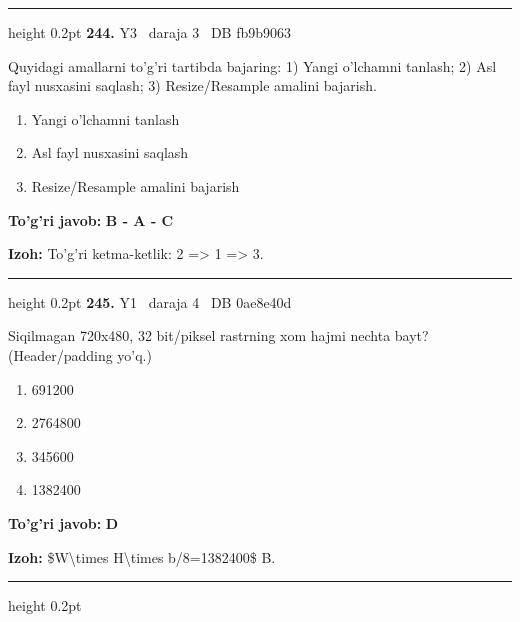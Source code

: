 \documentclass[10pt,a4paper,oneside]{article}
\begin{document}
\vspace{2mm}\hrule height 0.2pt \vspace{4mm}
\hypertarget{q244}{\textbf{\color{ink}244.}}  {\color{muted}\scriptsize Y3 \textbullet\ daraja 3 \textbullet\ DB fb9b9063}
\par
Quyidagi amallarni to'g'ri tartibda bajaring: 1) Yangi o'lchamni tanlash; 2) Asl fayl nusxasini saqlash; 3) Resize/Resample amalini bajarish.
\begin{enumerate}[label=\Alph*),leftmargin=9mm]
\item Yangi o'lchamni tanlash
\item Asl fayl nusxasini saqlash
\item Resize/Resample amalini bajarish
\end{enumerate}
\begin{tcolorbox}[enhanced,breakable,colback=teal!4,colframe=teal!45!black,boxrule=0.45pt,arc=1.2mm,left=2.8mm,right=2.8mm,top=2mm,bottom=2mm,before skip=2mm,after skip=2mm]
\textbf{\color{teal}To'g'ri javob:} \textbf{B - A - C}
\par\smallskip
\textbf{Izoh:} To'g'ri ketma-ketlik: 2 =\textgreater{} 1 =\textgreater{} 3.
\end{tcolorbox}
\vspace{2mm}\hrule height 0.2pt \vspace{4mm}
\hypertarget{q245}{\textbf{\color{ink}245.}}  {\color{muted}\scriptsize Y1 \textbullet\ daraja 4 \textbullet\ DB 0ae8e40d}
\par
Siqilmagan 720x480, 32 bit/piksel rastrning xom hajmi nechta bayt? (Header/padding yo'q.)
\begin{enumerate}[label=\Alph*),leftmargin=9mm]
\item 691200
\item 2764800
\item 345600
\item 1382400
\end{enumerate}
\begin{tcolorbox}[enhanced,breakable,colback=teal!4,colframe=teal!45!black,boxrule=0.45pt,arc=1.2mm,left=2.8mm,right=2.8mm,top=2mm,bottom=2mm,before skip=2mm,after skip=2mm]
\textbf{\color{teal}To'g'ri javob:} \textbf{D}
\par\smallskip
\textbf{Izoh:} \$W\textbackslash{}times H\textbackslash{}times b/8=1382400\$ B.
\end{tcolorbox}
\vspace{2mm}\hrule height 0.2pt \vspace{4mm}
\end{document}

